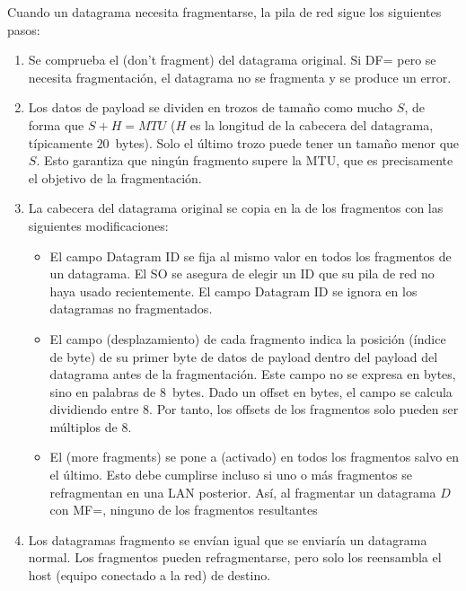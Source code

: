 Cuando un datagrama necesita fragmentarse, la pila de red sigue 
los siguientes pasos:
\begin{enumerate}

\item Se comprueba el  (don't fragment) del datagrama original.
    Si DF= pero se necesita fragmentación, el datagrama no se fragmenta 
    y se produce un error.\\[-0.2cm]

\item Los datos de payload se dividen en trozos de tamaño como mucho $S$, de forma que $S + H = MTU$ 
  ($H$ es la longitud de la cabecera del datagrama, típicamente $20$~bytes). Solo el último trozo
  puede tener un tamaño menor que $S$. Esto garantiza que ningún fragmento supere la MTU,
  que es precisamente el objetivo de la fragmentación.\\[-0.2cm]
  
\item La cabecera del datagrama original se copia en la de los fragmentos con las siguientes modificaciones:
  \begin{itemize}
  \item El campo Datagram ID se fija al mismo valor en todos los fragmentos de un datagrama. 
    El SO se asegura de elegir un ID que su pila de red no haya usado recientemente.
    El campo Datagram ID se ignora en los datagramas no fragmentados.\\[-0.3cm]
    
  \item El campo  (desplazamiento) de cada fragmento indica la posición (índice de byte)
    de su primer byte de datos de payload dentro del payload del datagrama antes de la fragmentación.
    Este campo no se expresa en bytes, sino en palabras de $8$~bytes.
    Dado un offset en bytes, el campo  se calcula dividiendo entre $8$.
    Por tanto, los offsets de los fragmentos solo pueden ser múltiplos de $8$.\\[-0.3cm]
    
  \item El  (more fragments) se pone a  (activado)
    en todos los fragmentos salvo en el último. Esto debe cumplirse incluso si uno o más
    fragmentos se refragmentan en una LAN posterior. Así, al fragmentar un 
    datagrama $D$ con MF=, ninguno de los fragmentos resultantes\\[-0.2cm]
  \end{itemize}
  
\item Los datagramas fragmento se envían igual que se enviaría un datagrama normal.
  Los fragmentos pueden refragmentarse, pero solo los reensambla el host (equipo conectado a la red) de destino.
  
\end{enumerate}



